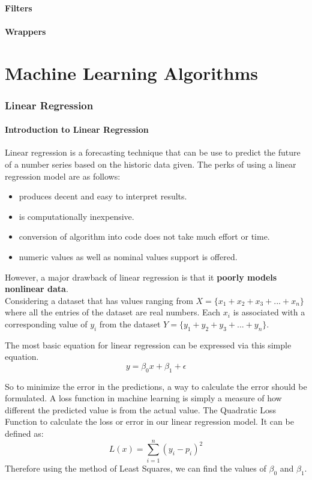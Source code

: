 \documentclass[12pt]{article}
\begin{document}
\subsection{Filters}
\subsection{Wrappers}
\newpage
\part{Machine Learning Algorithms}
\newpage
\section{Linear Regression}
\subsection{Introduction to Linear Regression}
Linear regression is a forecasting technique that can be use to predict the future of a number series based on the historic data given. The perks of using a linear regression model are as follows:

\begin{itemize}
  \item produces decent and  easy to interpret results.
  \item is computationally inexpensive.
  \item conversion of algorithm into code does not take much effort or time.
  \item numeric values as well as nominal values support is offered.
\end{itemize}

However, a major drawback of linear regression is that it \textbf{poorly models nonlinear data}.
\\
Considering a dataset that has values ranging from 
$X = \lbrace x_{1}+x_{2}+x_{3}+...+x_{n} \rbrace$ where
all the entries of the dataset are real numbers. Each $x_{i}$ is associated with a corresponding value of $y_{i}$ from the dataset $Y = \lbrace y_{1}+y_{2}+y_{3}+...+y_{n} \rbrace$.

The most basic equation for linear regression can be expressed via this simple equation.
$$y = \beta_{0}x+\beta_{1}+\epsilon$$

So to minimize the error in the predictions, a way to calculate the error should be formulated. A loss function in machine learning is simply a measure of how different the predicted value is from the actual value. The Quadratic Loss Function to calculate the loss or error in our linear regression model. It can be defined as:
$$L(x) = \sum_{i=1}^{n}(y_{i}-p_{i})^{2} $$
Therefore using the method of Least Squares, we can find the values of $\beta_{0}$ and $\beta_{1}$.
\end{document}
